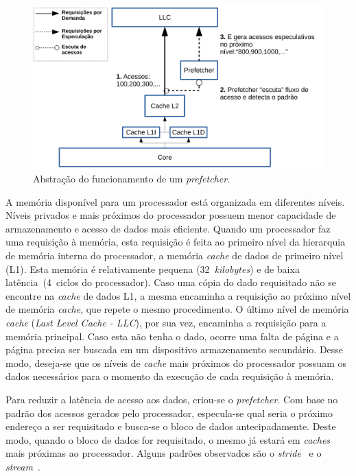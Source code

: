\documentclass[12pt]{article}
\begin{document}
\begin{figure}[b!]
    \centering
        \includegraphics[width=\textwidth]{figures/figpref.pdf}
  \caption{Abstração do funcionamento de um \emph{prefetcher}.}
  \label{fig:prefetcher}
\end{figure}

\vspace{-1mm}
A memória disponível para um processador está organizada em diferentes níveis. 
Níveis privados e mais próximos do processador possuem menor capacidade de armazenamento e acesso de dados mais eficiente.
Quando um processador faz uma requisição à memória, esta requisição é feita ao primeiro nível da hierarquia de memória interna do processador, a memória \textit{cache} de dados de primeiro nível (L1).
Esta memória é relativamente pequena (32~\emph{kilobytes}) e de baixa latência~(4~ciclos do processador).
Caso uma cópia do dado requisitado não se encontre na \textit{cache} de dados L1, a mesma encaminha a requisição ao próximo nível de memória \emph{cache}, que repete o mesmo procedimento.
O último nível de memória \textit{cache} (\textit{Last Level Cache - LLC}), por sua vez, encaminha a requisição para a memória principal.
Caso esta não tenha o dado, ocorre uma falta de página e a página precisa ser buscada em um dispositivo armazenamento secundário.
Desse modo, deseja-se que os níveis de \textit{cache} mais próximos do processador possuam os dados necessários para o momento da execução de cada requisição à memória.


\vspace{-2mm}
Para reduzir a latência de acesso aos dados, criou-se o \textit{prefetcher}.
Com base no padrão dos acessos gerados pelo processador, especula-se qual seria o próximo endereço a ser requisitado e busca-se o bloco de dados antecipadamente.
Deste modo, quando o bloco de dados for requisitado, o mesmo já estará em \emph{caches} mais próximas ao processador.
Alguns padrões observados são o \emph{stride}~\cite{chen1995effective} e o \emph{stream}~\mbox{\cite{le2007ibm}}.
\end{document}
